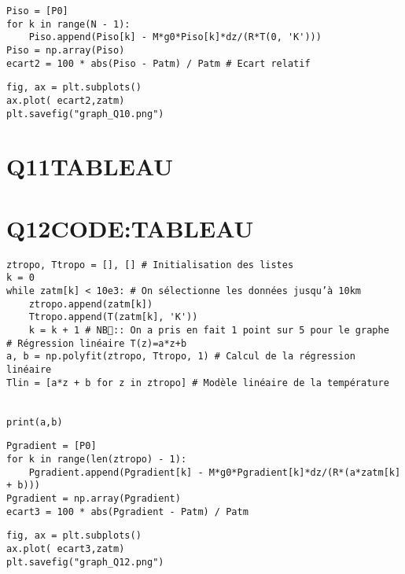 \documentclass[11pt]{article}
\begin{document}
\begin{verbatim}
Piso = [P0]
for k in range(N - 1):
    Piso.append(Piso[k] - M*g0*Piso[k]*dz/(R*T(0, 'K')))
Piso = np.array(Piso)
ecart2 = 100 * abs(Piso - Patm) / Patm # Ecart relatif
\end{verbatim}

\begin{verbatim}
fig, ax = plt.subplots()
ax.plot( ecart2,zatm)
plt.savefig("graph_Q10.png")
\end{verbatim}


\section{Q11\hfill{}\textsc{TABLEAU}}
\label{sec:org47bbe89}

\section{Q12\hfill{}\textsc{CODE:TABLEAU}}
\label{sec:org9e767b4}

\begin{verbatim}
ztropo, Ttropo = [], [] # Initialisation des listes
k = 0
while zatm[k] < 10e3: # On sélectionne les données jusqu’à 10km
    ztropo.append(zatm[k])
    Ttropo.append(T(zatm[k], 'K'))
    k = k + 1 # NB:: On a pris en fait 1 point sur 5 pour le graphe
# Régression linéaire T(z)=a*z+b
a, b = np.polyfit(ztropo, Ttropo, 1) # Calcul de la régression linéaire
Tlin = [a*z + b for z in ztropo] # Modèle linéaire de la température


print(a,b)
\end{verbatim}

\begin{verbatim}
Pgradient = [P0]
for k in range(len(ztropo) - 1):
    Pgradient.append(Pgradient[k] - M*g0*Pgradient[k]*dz/(R*(a*zatm[k] + b)))
Pgradient = np.array(Pgradient)
ecart3 = 100 * abs(Pgradient - Patm) / Patm
\end{verbatim}

\begin{verbatim}
fig, ax = plt.subplots()
ax.plot( ecart3,zatm)
plt.savefig("graph_Q12.png")
\end{verbatim}
\end{document}
